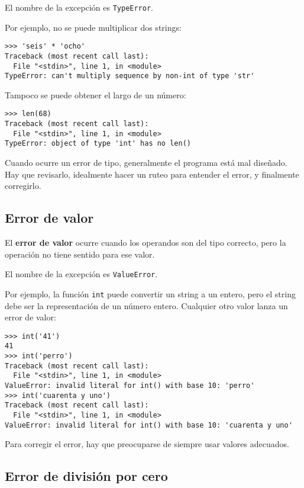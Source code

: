 El nombre de la excepción es \lstinline!TypeError!.

Por ejemplo, no se puede multiplicar dos strings:

\begin{lstlisting}
>>> 'seis' * 'ocho'
Traceback (most recent call last):
  File "<stdin>", line 1, in <module>
TypeError: can't multiply sequence by non-int of type 'str'
\end{lstlisting}

Tampoco se puede obtener el largo de un número:

\begin{lstlisting}
>>> len(68)
Traceback (most recent call last):
  File "<stdin>", line 1, in <module>
TypeError: object of type 'int' has no len()
\end{lstlisting}

Cuando ocurre un error de tipo, generalmente el programa está mal
diseñado. Hay que revisarlo, idealmente hacer un ruteo para entender el
error, y finalmente corregirlo.

\subsection{Error de valor}

El \textbf{error de valor} ocurre cuando los operandos son del tipo
correcto, pero la operación no tiene sentido para ese valor.

El nombre de la excepción es \lstinline!ValueError!.

Por ejemplo, la función \lstinline!int! puede convertir un string a un
entero, pero el string debe ser la representación de un número entero.
Cualquier otro valor lanza un error de valor:

\begin{lstlisting}
>>> int('41')
41
>>> int('perro')
Traceback (most recent call last):
  File "<stdin>", line 1, in <module>
ValueError: invalid literal for int() with base 10: 'perro'
>>> int('cuarenta y uno')
Traceback (most recent call last):
  File "<stdin>", line 1, in <module>
ValueError: invalid literal for int() with base 10: 'cuarenta y uno'
\end{lstlisting}

Para corregir el error, hay que preocuparse de siempre usar valores
adecuados.

\subsection{Error de división por cero}


